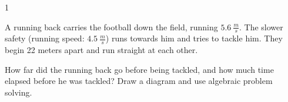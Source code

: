 
\AddToShipoutPicture*{\BackgroundPic}

\addtocounter {ProbNum} {1}

 
{\bf \Large{}} A running back carries the football down the field, running ${5.6~\tfrac{m}{s}}$.  The slower safety (running speed: ${4.5~\tfrac{m}{s}}$) runs towards him and tries to tackle him. They begin 22 meters apart and run straight at each other.  

\bigskip

How far did the running back go before being tackled, and how much time elapsed before he was tackled? Draw a diagram and use algebraic problem solving.

 
\vfill

\newpage
